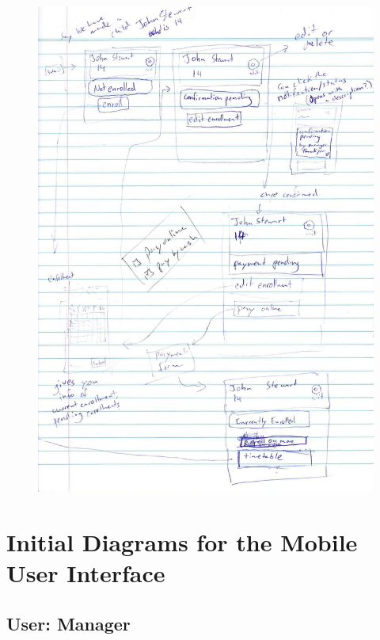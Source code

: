 \documentclass{l3proj}
\begin{document}
{
\begin{figure}[h]
\centering
\includegraphics[scale=0.50]{0085_001-page-004.jpg}
\end{figure}
}

\pagebreak
\section{Initial Diagrams for the Mobile User Interface}

\subsection{User: Manager}
\end{document}
